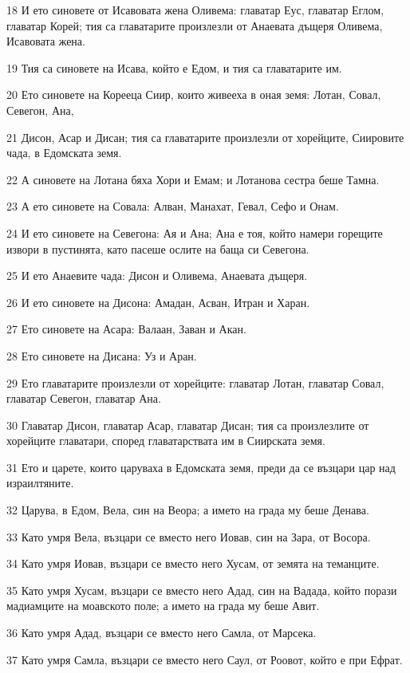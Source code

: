 \par 18 И ето синовете от Исавовата жена Оливема: главатар Еус, главатар Еглом, главатар Корей; тия са главатарите произлезли от Анаевата дъщеря Оливема, Исавовата жена.
\par 19 Тия са синовете на Исава, който е Едом, и тия са главатарите им.
\par 20 Ето синовете на Корееца Сиир, които живееха в оная земя: Лотан, Совал, Севегон, Ана,
\par 21 Дисон, Асар и Дисан; тия са главатарите произлезли от хорейците, Сиировите чада, в Едомската земя.
\par 22 А синовете на Лотана бяха Хори и Емам; и Лотанова сестра беше Тамна.
\par 23 А ето синовете на Совала: Алван, Манахат, Гевал, Сефо и Онам.
\par 24 И ето синовете на Севегона: Ая и Ана; Ана е тоя, който намери горещите извори в пустинята, като пасеше ослите на баща си Севегона.
\par 25 И ето Анаевите чада: Дисон и Оливема, Анаевата дъщеря.
\par 26 И ето синовете на Дисона: Амадан, Асван, Итран и Харан.
\par 27 Ето синовете на Асара: Валаан, Заван и Акан.
\par 28 Ето синовете на Дисана: Уз и Аран.
\par 29 Ето главатарите произлезли от хорейците: главатар Лотан, главатар Совал, главатар Севегон, главатар Ана.
\par 30 Главатар Дисон, главатар Асар, главатар Дисан; тия са произлезлите от хорейците главатари, според главатарствата им в Сиирската земя.
\par 31 Ето и царете, които царуваха в Едомската земя, преди да се възцари цар над израилтяните.
\par 32 Царува, в Едом, Вела, син на Веора; а името на града му беше Денава.
\par 33 Като умря Вела, възцари се вместо него Иовав, син на Зара, от Восора.
\par 34 Като умря Иовав, възцари се вместо него Хусам, от земята на теманците.
\par 35 Като умря Хусам, възцари се вместо него Адад, син на Вадада, който порази мадиамците на моавското поле; а името на града му беше Авит.
\par 36 Като умря Адад, възцари се вместо него Самла, от Марсека.
\par 37 Като умря Самла, възцари се вместо него Саул, от Роовот, който е при Ефрат.
